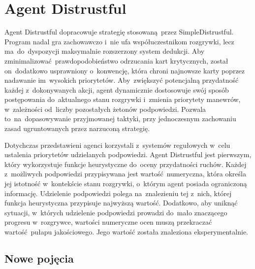 \documentclass[declaration,shortabstract,inz]{iithesis}
\begin{document}
\section{Agent Distrustful}

Agent Distrustful dopracowuje strategię stosowaną przez SimpleDistrustful. Program nadal gra zachowawczo i~nie ufa współuczestnikom rozgrywki, lecz ma~do~dyspozycji maksymalnie rozszerzony system dedukcji. Aby zminimalizować prawdopodobieństwo odrzucania kart krytycznych, został on~dodatkowo usprawniony o~konwencję, która chroni najnowsze karty poprzez nadawanie im~wysokich priorytetów. Aby~zwiększyć potencjalną przydatność każdej z~dokonywanych akcji, agent dynamicznie dostosowuje swój sposób postępowania do~aktualnego stanu rozgrywki i~zmienia priorytety manewrów, w~zależności od~liczby pozostałych żetonów podpowiedzi. Pozwala to~na~dopasowywanie przyjmowanej taktyki, przy jednoczesnym zachowaniu zasad ugruntowanych przez narzuconą strategię.

Dotychczas przedstawieni agenci korzystali z~systemów regułowych w~celu ustalenia priorytetów udzielanych podpowiedzi. Agent Distrustful jest pierwszym, który wykorzystuje funkcje heurystyczne do~oceny przydatności ruchów. Każdej z~możliwych podpowiedzi przypisywana jest wartość numeryczna, która określa jej istotność w~kontekście stanu rozgrywki, o~którym agent posiada ograniczoną informację. Udzielenie podpowiedzi polega na~znalezieniu tej z~nich, której funkcja heurystyczna przypisuje najwyższą wartość. Dodatkowo, aby uniknąć sytuacji, w~których udzielenie podpowiedzi prowadzi do~mało znaczącego progresu w~rozgrywce, wartości numeryczne ocen muszą przekraczać wartość pułapu jakościowego. Jego wartość została znaleziona eksperymentalnie.

\subsection*{Nowe pojęcia}
\end{document}
